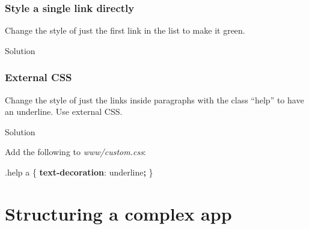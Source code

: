 \documentclass[
]{book}
\newenvironment{Shaded}{\begin{snugshade}}{\end{snugshade}}
\newcommand{\AttributeTok}[1]{\textcolor[rgb]{0.77,0.63,0.00}{#1}}
\newcommand{\DecValTok}[1]{\textcolor[rgb]{0.00,0.00,0.81}{#1}}
\newcommand{\FunctionTok}[1]{\textcolor[rgb]{0.00,0.00,0.00}{#1}}
\newcommand{\KeywordTok}[1]{\textcolor[rgb]{0.13,0.29,0.53}{\textbf{#1}}}
\newcommand{\NormalTok}[1]{#1}
\newcommand{\OperatorTok}[1]{\textcolor[rgb]{0.81,0.36,0.00}{\textbf{#1}}}
\newcommand{\SpecialCharTok}[1]{\textcolor[rgb]{0.00,0.00,0.00}{#1}}
\newcommand{\StringTok}[1]{\textcolor[rgb]{0.31,0.60,0.02}{#1}}
\begin{document}
\hypertarget{style-a-single-link-directly}{%
\subsection{Style a single link directly}\label{style-a-single-link-directly}}

Change the style of just the first link in the list to make it green.

Solution

\begin{Shaded}
\end{Shaded}

\hypertarget{external-css-1}{%
\subsection{External CSS}\label{external-css-1}}

Change the style of just the links inside paragraphs with the class ``help'' to have an underline. Use external CSS.

Solution

Add the following to \emph{www/custom.css}:

\begin{Shaded}
\begin{Highlighting}[]
\FunctionTok{.help}\NormalTok{ a \{ }\KeywordTok{text{-}decoration}\NormalTok{: }\DecValTok{underline}\OperatorTok{;}\NormalTok{ \}}
\end{Highlighting}
\end{Shaded}

\hypertarget{structure}{%
\chapter{Structuring a complex app}\label{structure}}
\end{document}
